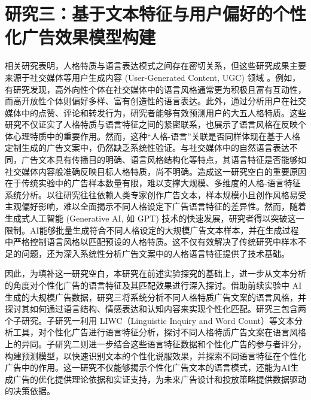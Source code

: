\chapter{研究三：基于文本特征与用户偏好的个性化广告效果模型构建}

相关研究表明，人格特质与语言表达模式之间存在密切关系，但这些研究成果主要来源于社交媒体等用户生成内容 (User-Generated Content, UGC) 领域 \citep{azucar2018predicting}。例如，有研究发现，高外向性个体在社交媒体中的语言风格通常更为积极且富有互动性，而高开放性个体则偏好多样、富有创造性的语言表达。此外，通过分析用户在社交媒体中的点赞、评论和转发行为，研究者能够有效预测用户的大五人格特质。这些研究不仅证实了人格特质与语言特征之间的紧密联系，也展示了语言风格在反映个体心理特质中的重要作用。然而，这种“人格-语言”关联是否同样体现在基于人格定制生成的广告文案中，仍然缺乏系统性验证。与社交媒体中的自然语言表达不同，广告文本具有传播目的明确、语言风格结构化等特点，其语言特征是否能够如社交媒体内容般准确反映目标人格特质，尚不明确。造成这一研究空白的重要原因在于传统实验中的广告样本数量有限，难以支撑大规模、多维度的人格-语言特征系统分析。以往研究往往依赖人类专家创作广告文本，样本规模小且创作风格易受主观偏好影响，难以全面揭示不同人格设定下广告语言特征的差异性。然而，随着生成式人工智能 (Generative AI, 如 GPT) 技术的快速发展，研究者得以突破这一限制。AI能够批量生成符合不同人格设定的大规模广告文本样本，并在生成过程中严格控制语言风格以匹配预设的人格特质。这不仅有效解决了传统研究中样本不足的问题，还为深入系统性分析广告文案中的人格语言特征提供了技术基础。

因此，为填补这一研究空白，本研究在前述实验探究的基础上，进一步从文本分析的角度对个性化广告的语言特征及其匹配效果进行深入探讨。借助前续实验中 AI 生成的大规模广告数据，研究三将系统分析不同人格特质广告文案的语言风格，并探讨其如何通过语言结构、情感表达和认知内容来实现个性化匹配。研究三包含两个子研究。子研究一利用 LIWC（Linguistic Inquiry and Word Count）等文本分析工具，对个性化广告进行语言特征分析，探讨不同人格特质广告文案在语言风格上的异同。子研究二则进一步结合这些语言特征数据和个性化广告的参与者评分，构建预测模型，以快速识别文本的个性化说服效果，并探索不同语言特征在个性化广告中的作用。这一研究不仅能够揭示个性化广告文本的语言模式，还能为AI生成广告的优化提供理论依据和实证支持，为未来广告设计和投放策略提供数据驱动的决策依据。





